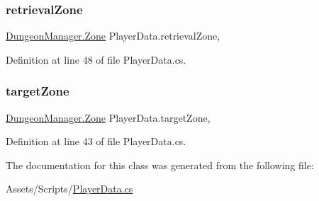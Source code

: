 \mbox{\label{class_player_data_aed5e24eed1db76e3d8954ab05e8f342c}} 
\subsubsection{\texorpdfstring{retrievalZone}{retrievalZone}}
{\footnotesize\ttfamily \mbox{\hyperlink{class_dungeon_manager_a6558d4a01889674bf25c798f1b90a431}{Dungeon\+Manager.\+Zone}} Player\+Data.\+retrieval\+Zone\hspace{0.3cm}{\ttfamily [get]}, {\ttfamily [set]}}



Definition at line 48 of file Player\+Data.\+cs.

\mbox{\label{class_player_data_a5671b8f488e96c5263bb062200ae781a}} 
\subsubsection{\texorpdfstring{targetZone}{targetZone}}
{\footnotesize\ttfamily \mbox{\hyperlink{class_dungeon_manager_a6558d4a01889674bf25c798f1b90a431}{Dungeon\+Manager.\+Zone}} Player\+Data.\+target\+Zone\hspace{0.3cm}{\ttfamily [get]}, {\ttfamily [set]}}



Definition at line 43 of file Player\+Data.\+cs.



The documentation for this class was generated from the following file\+:\begin{DoxyCompactItemize}
\item 
Assets/\+Scripts/\mbox{\hyperlink{_player_data_8cs}{Player\+Data.\+cs}}\end{DoxyCompactItemize}
